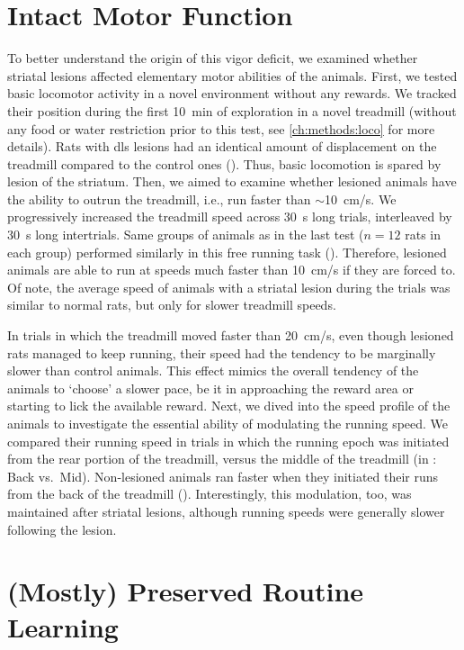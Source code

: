 \section{Intact Motor Function}
\label{ch:lesion:motorOk}

To better understand the origin of this vigor deficit, we examined whether striatal lesions affected elementary motor abilities of the animals.
First, we tested basic locomotor activity in a novel environment without any rewards.
We tracked their position during the first 10~min of exploration in a novel treadmill (without any food or water restriction prior to this test, see \autoref{ch:methods:loco} for more details).
Rats with \gls{dls} lesions had an identical amount of displacement on the treadmill compared to the control ones ().
Thus, basic locomotion is spared by lesion of the striatum.
Then, we aimed to examine whether lesioned animals have the ability to outrun the treadmill, i.e., run faster than $\sim$10~cm/s.
We progressively increased the treadmill speed across 30~s long trials, interleaved by 30~s long intertrials.
Same groups of animals as in the last test ($n=12$ rats in each group) performed similarly in this free running task ().
Therefore, lesioned animals are able to run at speeds much faster than 10~cm/s if they are forced to.
Of note, the average speed of animals with a striatal lesion during the trials was similar to normal rats, but only for slower treadmill speeds.

In trials in which the treadmill moved faster than 20~cm/s, even though lesioned rats managed to keep running, their speed had the tendency to be marginally slower than control animals.
This effect mimics the overall tendency of the animals to `choose' a slower pace, be it in approaching the reward area or starting to lick the available reward.
Next, we dived into the speed profile of the animals to investigate the essential ability of modulating the running speed.
We compared their running speed in trials in which the running epoch was initiated from the rear portion of the treadmill, versus the middle of the treadmill (in : Back vs.\ Mid).
Non-lesioned animals ran faster when they initiated their runs from the back of the treadmill ().
Interestingly, this modulation, too, was maintained after striatal lesions, although running speeds were generally slower following the lesion.


\section[Preserved Routine Learning]{(Mostly) Preserved Routine Learning}
\label{ch:lesion:learn}

